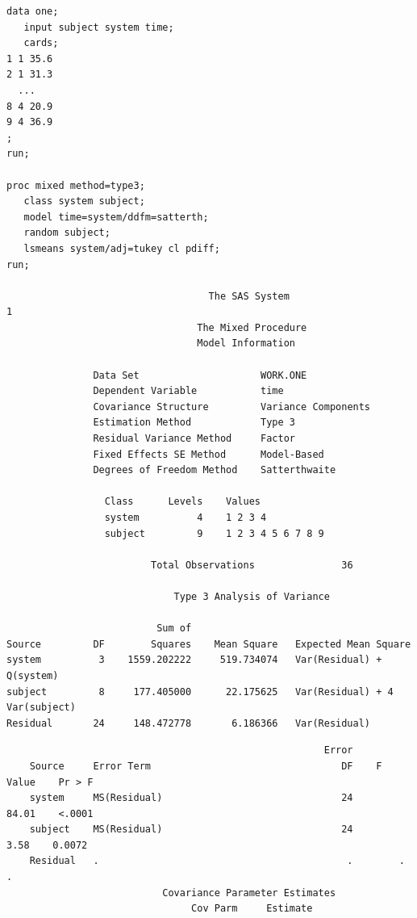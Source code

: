 \begin{large}
\begin{verbatim}
data one;
   input subject system time;
   cards;
1 1 35.6
2 1 31.3
  ...
8 4 20.9
9 4 36.9
;
run;

proc mixed method=type3;
   class system subject;
   model time=system/ddfm=satterth;
   random subject;
   lsmeans system/adj=tukey cl pdiff;
run;

                                   The SAS System                                   1
                                 The Mixed Procedure
                                 Model Information

               Data Set                     WORK.ONE                 
               Dependent Variable           time                     
               Covariance Structure         Variance Components      
               Estimation Method            Type 3                   
               Residual Variance Method     Factor                   
               Fixed Effects SE Method      Model-Based              
               Degrees of Freedom Method    Satterthwaite            

                 Class      Levels    Values
                 system          4    1 2 3 4                       
                 subject         9    1 2 3 4 5 6 7 8 9             

                         Total Observations               36

                             Type 3 Analysis of Variance
 
                          Sum of
Source         DF        Squares    Mean Square   Expected Mean Square
system          3    1559.202222     519.734074   Var(Residual) + Q(system)          
subject         8     177.405000      22.175625   Var(Residual) + 4 Var(subject)     
Residual       24     148.472778       6.186366   Var(Residual)                     
\end{verbatim} 
\newpage
\begin{verbatim} 
                                                       Error
    Source     Error Term                                 DF    F Value    Pr > F
    system     MS(Residual)                               24      84.01    <.0001
    subject    MS(Residual)                               24       3.58    0.0072
    Residual   .                                           .        .       .    
                           Covariance Parameter Estimates
                                Cov Parm     Estimate
                                                                                

\end{verbatim}
\end{large}
